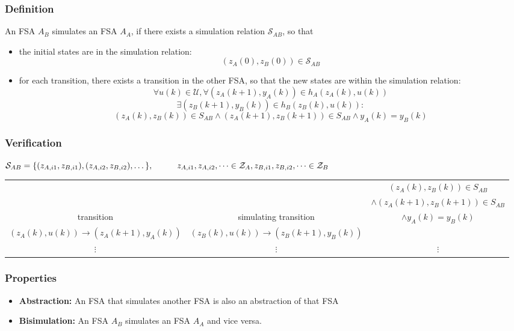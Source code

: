 \documentclass[10pt,a4paper]{article}
\newcommand{\tab}[1][1]{\hspace*{#1cm}}
\begin{document}
\subsubsection{Definition}
An FSA $A_B$ simulates an FSA $A_A$, if there exists a simulation relation $\mathcal S_{AB}$, so that
\begin{itemize}
	\item the initial states are in the simulation relation:
	$$
		(z_A(0), z_B(0)) \in \mathcal S_{AB}
	$$
	\item for each transition, there exists a transition in the other FSA, so that the new states are within the simulation relation:
	$$
		\forall u(k) \in \mathcal U, \forall(z_A(k + 1), y_A(k)) \in h_A(z_A(k), u(k))
	$$
	$$
		\exists (z_B(k + 1), y_B(k)) \in h_B(z_B(k), u(k)):
	$$
	$$
		(z_A(k), z_B(k)) \in S_{AB} \land (z_A(k + 1), z_B(k + 1)) \in S_{AB} \land y_A(k) = y_B(k)
	$$
\end{itemize}

\subsubsection{Verification}
$\mathcal S_{AB} = \{(z_{A,i1}, z_{B, i1}), (z_{A,i2}, z_{B, i2}), \dots \}, \tab z_{A, i1}, z_{A, i2}, \dots \in \mathcal Z_A, z_{B, i1}, z_{B, i2}, \dots \in \mathcal Z_B$ \\
 
\begin{tabular}{c|c|c}
	&& $(z_A(k), z_B(k)) \in S_{AB}$ \\
	&& $\land (z_A(k + 1), z_B(k + 1)) \in S_{AB} $ \\
	transition & simulating transition & $\land y_A(k) = y_B(k)$ \\
	\hline
	$(z_A(k), u(k)) → (z_A(k + 1), y_A(k))$ & $(z_B(k), u(k)) → (z_B(k + 1), y_B(k))$ & \\
	$\vdots$ & $\vdots$ & $\vdots$ 
\end{tabular}

\subsubsection{Properties}
\begin{itemize}
	\item \textbf{Abstraction:} An FSA that simulates another FSA is also an abstraction of that FSA
	\item \textbf{Bisimulation:} An FSA $A_B$ simulates an FSA $A_A$ and vice versa.
\end{itemize}
\end{document}
